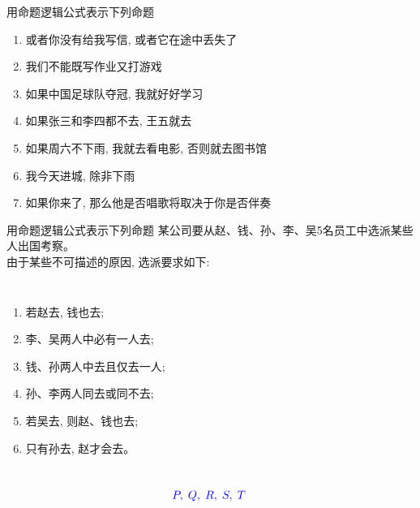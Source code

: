 \begin{frame}{}
  \begin{exampleblock}{用命题逻辑公式表示下列命题}
    \begin{enumerate}[<+->][(1)]
      \setlength{\itemsep}{8pt}
      \item 或者你没有给我写信, 或者它在途中丢失了
      \item 我们不能既写作业又打游戏
      \item 如果中国足球队夺冠, 我就好好学习
      \item 如果张三和李四都不去, 王五就去
      \item 如果周六不下雨, 我就去看电影, 否则就去图书馆
      \item 我今天进城, 除非下雨
      \item 如果你来了, 那么他是否唱歌将取决于你是否伴奏
    \end{enumerate}
  \end{exampleblock}
\end{frame}

\begin{frame}{}
  \begin{exampleblock}{用命题逻辑公式表示下列命题}
    某公司要从赵、钱、孙、李、吴5名员工中选派某些人出国考察。\\
    由于某些不可描述的原因, 选派要求如下:

    \begin{columns}
        \begin{enumerate}[(1)]
          \item 若赵去, 钱也去;
          \item 李、吴两人中必有一人去;
          \item 钱、孙两人中去且仅去一人;
          \item 孙、李两人同去或同不去;
          \item 若吴去, 则赵、钱也去;
          \item 只有孙去, 赵才会去。
        \end{enumerate}
    \end{columns}
  \end{exampleblock}

  \pause
  \vspace{0.30cm}
  \[
    \textcolor{blue}{P,\; Q,\; R,\; S,\; T\;}
  \]
\end{frame}
